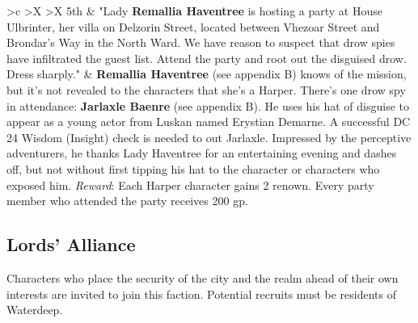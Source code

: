 \documentclass[10pt,a4paper,twoside,twocolumn,openany,nodeprecatedcode]{dndbook}
\begin{document}
\begin{DndTable}{>{\hsize}c >{\hsize}X >{\hsize}X}
5th & "Lady \textbf{Remallia Haventree} is hosting a party at House Ulbrinter, her villa on Delzorin Street, located between Vhezoar Street and Brondar's Way in the North Ward. We have reason to suspect that drow spies have infiltrated the guest list. Attend the party and root out the disguised drow. Dress sharply." & \textbf{Remallia Haventree} (see appendix B) knows of the mission, but it's not revealed to the characters that she's a Harper. There's one drow spy in attendance: \textbf{Jarlaxle Baenre} (see appendix B). He uses his hat of disguise to appear as a young actor from Luskan named Erystian Demarne. A successful DC 24 Wisdom (Insight) check is needed to out Jarlaxle. Impressed by the perceptive adventurers, he thanks Lady Haventree for an entertaining evening and dashes off, but not without first tipping his hat to the character or characters who exposed him. \textit{Reward}: Each Harper character gains 2 renown. Every party member who attended the party receives 200 gp.\\
\end{DndTable}


\subsection{Lords' Alliance}
Characters who place the security of the city and the realm ahead of their own interests are invited to join this faction. Potential recruits must be residents of Waterdeep.
\end{document}
